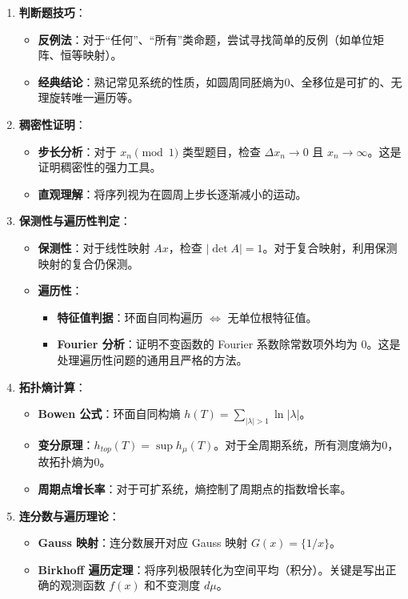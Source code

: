 \documentclass[a4paper,12pt]{article}
\begin{document}
\begin{enumerate}
    \item \textbf{判断题技巧}：
    \begin{itemize}
        \item \textbf{反例法}：对于“任何”、“所有”类命题，尝试寻找简单的反例（如单位矩阵、恒等映射）。
        \item \textbf{经典结论}：熟记常见系统的性质，如圆周同胚熵为0、全移位是可扩的、无理旋转唯一遍历等。
    \end{itemize}

    \item \textbf{稠密性证明}：
    \begin{itemize}
        \item \textbf{步长分析}：对于 $x_n \pmod 1$ 类型题目，检查 $\Delta x_n \to 0$ 且 $x_n \to \infty$。这是证明稠密性的强力工具。
        \item \textbf{直观理解}：将序列视为在圆周上步长逐渐减小的运动。
    \end{itemize}

    \item \textbf{保测性与遍历性判定}：
    \begin{itemize}
        \item \textbf{保测性}：对于线性映射 $Ax$，检查 $|\det A|=1$。对于复合映射，利用保测映射的复合仍保测。
        \item \textbf{遍历性}：
        \begin{itemize}
            \item \textbf{特征值判据}：环面自同构遍历 $\iff$ 无单位根特征值。
            \item \textbf{Fourier 分析}：证明不变函数的 Fourier 系数除常数项外均为 0。这是处理遍历性问题的通用且严格的方法。
        \end{itemize}
    \end{itemize}

    \item \textbf{拓扑熵计算}：
    \begin{itemize}
        \item \textbf{Bowen 公式}：环面自同构熵 $h(T) = \sum_{|\lambda|>1} \ln |\lambda|$。
        \item \textbf{变分原理}：$h_{top}(T) = \sup h_\mu(T)$。对于全周期系统，所有测度熵为0，故拓扑熵为0。
        \item \textbf{周期点增长率}：对于可扩系统，熵控制了周期点的指数增长率。
    \end{itemize}

    \item \textbf{连分数与遍历理论}：
    \begin{itemize}
        \item \textbf{Gauss 映射}：连分数展开对应 Gauss 映射 $G(x) = \{1/x\}$。
        \item \textbf{Birkhoff 遍历定理}：将序列极限转化为空间平均（积分）。关键是写出正确的观测函数 $f(x)$ 和不变测度 $d\mu$。
    \end{itemize}
\end{enumerate}
\end{document}

